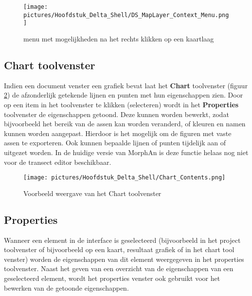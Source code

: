 \begin{figure}[h!]
	\centering
		\texttt{[image: pictures/Hoofdstuk\_Delta\_Shell/DS\_MapLayer\_Context\_Menu.png]}
		\caption{menu met mogelijkheden na het rechts klikken op een kaartlaag}
	\label{fig:MapLayer_Context_Menu}
\end{figure}

\subsection{Chart toolvenster}
	\label{DS_Chart_Contents}
Indien een document venster een grafiek bevat laat het \textbf{Chart} toolvenster (figuur \ref{fig:3_Chart_Contents}) de afzonderlijk getekende lijnen en punten met hun eigenschappen zien. Door op een item in het toolvenster te klikken (selecteren) wordt in het \textbf{Properties} toolvenster de eigenschappen getoond. Deze kunnen worden bewerkt, zodat bijvoorbeeld het bereik van de assen kan worden veranderd, of kleuren en namen kunnen worden aangepast. Hierdoor is het mogelijk om de figuren met vaste assen te exporteren. Ook kunnen bepaalde lijnen of punten tijdelijk aan of uitgezet worden. In de huidige versie van MorphAn is deze functie helaas nog niet voor de transect editor beschikbaar.

\begin{figure}[H]
	\centering
		\texttt{[image: pictures/Hoofdstuk\_Delta\_Shell/Chart\_Contents.png]}
		\caption{Voorbeeld weergave van het Chart toolvenster}
	\label{fig:3_Chart_Contents}
\end{figure}

\subsection{Properties}
Wanneer een element in de interface is geselecteerd (bijvoorbeeld in het project toolvenster of bijvoorbeeld op een kaart, resultaat grafiek of in het chart tool venster) worden de eigenschappen van dit element weergegeven in het properties toolvenster. Naast het geven van een overzicht van de eigenschappen van een geselecteerd element, wordt het properties venster ook gebruikt voor het bewerken van de getoonde eigenschappen.

